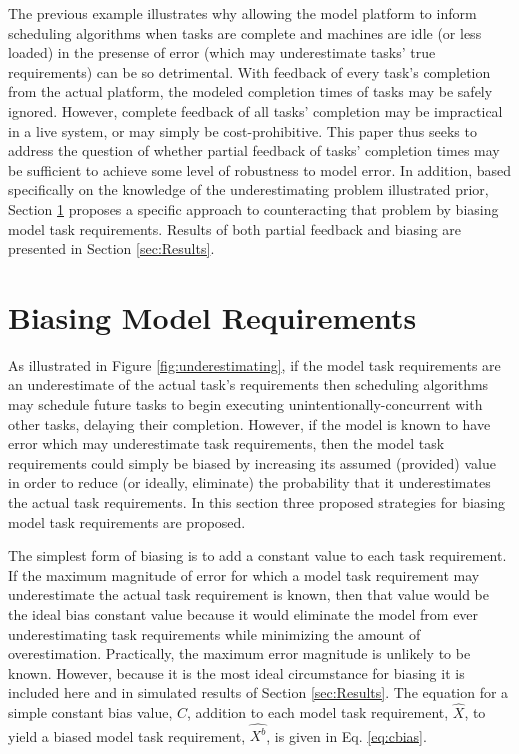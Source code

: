 \documentclass[10pt]{csce}
\begin{document}
The previous example illustrates why allowing the model platform to
inform scheduling algorithms when tasks are complete and machines are
idle (or less loaded) in the presense of error (which may underestimate tasks'
true requirements) can be so detrimental.  With feedback of every task's
completion from the actual platform, the modeled completion times of tasks
may be safely ignored.  However, complete feedback of all tasks' completion
may be impractical in a live system, or may simply be cost-prohibitive.
This paper thus seeks to address the question of whether partial feedback
of tasks' completion times may be sufficient to achieve some level of
robustness to model error.  In addition, based specifically on the knowledge
of the underestimating problem illustrated prior, Section \ref{sec:Biasing}
proposes a specific approach to counteracting that problem by biasing model
task requirements.  Results of both partial feedback and biasing are presented
in Section \ref{sec:Results}.


\section{Biasing Model Requirements}
\label{sec:Biasing}

As illustrated in Figure \ref{fig:underestimating}, if the model task
requirements are an underestimate of the actual task's requirements then
scheduling algorithms may schedule future tasks to begin executing
unintentionally-concurrent with other tasks, delaying their completion.
However, if the model is known to have error which may underestimate task
requirements, then the model task requirements could simply be biased by
increasing its assumed (provided) value in order to reduce (or ideally,
eliminate) the probability that it underestimates the actual task requirements.
In this section three proposed strategies for biasing model task requirements
are proposed.

The simplest form of biasing is to add a constant value to each task
requirement.  If the maximum magnitude of error for which a model
task requirement may underestimate the actual task requirement is known,
then that value would be the ideal bias constant value because it would
eliminate the model from ever underestimating task requirements while
minimizing the amount of overestimation. Practically, the maximum error
magnitude is unlikely to be known. However, because it is the most ideal
circumstance for biasing it is included here and in simulated results of
Section \ref{sec:Results}. The equation for a simple constant bias value, $C$,
addition to each model task requirement, $\hat{X}$, to yield a biased model
task requirement, $\hat{X^b}$, is given in Eq. \ref{eq:cbias}.
\end{document}
